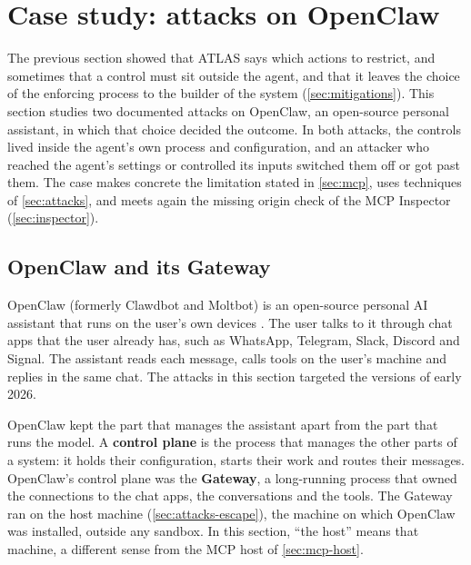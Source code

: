 \section{Case study: attacks on OpenClaw}
\label{sec:openclaw}

The previous section showed that ATLAS says which actions to restrict, and sometimes that a control
must sit outside the agent, and that it leaves the choice of the enforcing process to the builder of
the system (\cref{sec:mitigations}). This section studies two documented attacks on OpenClaw, an
open-source personal assistant, in which that choice decided the outcome. In both attacks, the
controls lived inside the agent's own process and configuration, and an attacker who reached the
agent's settings or controlled its inputs switched them off or got past them. The case makes
concrete the limitation stated in \cref{sec:mcp}, uses techniques of \cref{sec:attacks}, and meets
again the missing origin check of the MCP Inspector (\cref{sec:inspector}).

\subsection{OpenClaw and its Gateway}
\label{sec:openclaw-gateway}

OpenClaw (formerly Clawdbot and Moltbot) is an open-source personal AI assistant that runs on the
user's own devices \citep{openclaw-repo}. The user talks to it through chat apps that the user
already has, such as WhatsApp, Telegram, Slack, Discord and Signal. The assistant reads each
message, calls tools on the user's machine and replies in the same chat. The attacks in this
section targeted the versions of early 2026.

OpenClaw kept the part that manages the assistant apart from the part that runs the model. A
\textbf{control plane} is the process that manages the other parts of a system: it holds their
configuration, starts their work and routes their messages. OpenClaw's control plane was the
\textbf{Gateway}, a long-running process that owned the connections to the chat apps, the
conversations and the tools. The Gateway ran on the host machine (\cref{sec:attacks-escape}), the
machine on which OpenClaw was installed, outside any sandbox. In this section, ``the host'' means
that machine, a different sense from the MCP host of \cref{sec:mcp-host}.

